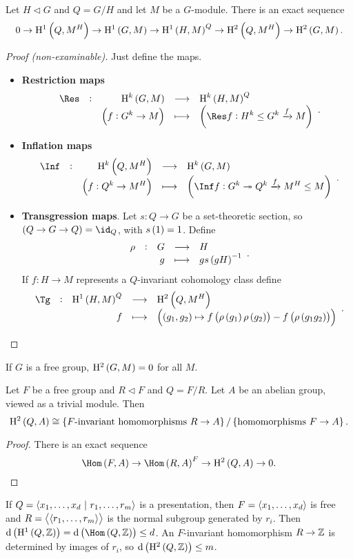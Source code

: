 \begin{theorem}
Let $ H \triangleleft G $ and $ Q = G / H $ and let $ M $ be a $ G $-module. There is an exact sequence
$$ 0 \to \H^1\br{Q, M^H} \to \H^1\br{G, M} \to \H^1\br{H, M}^Q \to \H^2\br{Q, M^H} \to \H^2\br{G, M}. $$
\end{theorem}

\begin{proof}[Proof (non-examinable)]
Just define the maps.
\begin{itemize}
\item \textbf{Restriction maps}
$$ \function[\Res]{\H^k\br{G, M}}{\H^k\br{H, M}^Q}{\br{f : G^k \to M}}{\br{\Res f : H^k \le G^k \xrightarrow{f} M}}. $$
\item \textbf{Inflation maps}
$$ \function[\Inf]{\H^k\br{Q, M^H}}{\H^k\br{G, M}}{\br{f : Q^k \to M^H}}{\br{\Inf f : G^k \twoheadrightarrow Q^k \xrightarrow{f} M^H \le M}}. $$
\item \textbf{Transgression maps}. Let $ s : Q \to G $ be a set-theoretic section, so $ \br{Q \to G \to Q} = \id_Q $, with $ s\br{1} = 1 $. Define
$$ \function[\rho]{G}{H}{g}{gs\br{gH}^{-1}}. $$
If $ f : H \to M $ represents a $ Q $-invariant cohomology class define
$$ \function[\Tg]{\H^1\br{H, M}^Q}{\H^2\br{Q, M^H}}{f}{\br{\br{g_1, g_2} \mapsto f\br{\rho\br{g_1}\rho\br{g_2}} - f\br{\rho\br{g_1g_2}}}}. $$
\end{itemize}
\end{proof}

\pagebreak

If $ G $ is a free group, $ \H^2\br{G, M} = 0 $ for all $ M $.

\begin{corollary}
Let $ F $ be a free group and $ R \triangleleft F $ and $ Q = F / R $. Let $ A $ be an abelian group, viewed as a trivial module. Then
$$ \H^2\br{Q, A} \cong \cbr{\text{$ F $-invariant homomorphisms} \ R \to A} / \cbr{\text{homomorphisms} \ F \to A}. $$
\end{corollary}

\begin{proof}
There is an exact sequence
$$ \Hom\br{F, A} \to \Hom\br{R, A}^F \to \H^2\br{Q, A} \to 0. $$
\end{proof}

If $ Q = \left\langle x_1, \dots, x_d \ \middle| \  r_1, \dots, r_m \right\rangle $ is a presentation, then $ F = \left\langle x_1, \dots, x_d \right\rangle $ is free and $ R = \left\langle \left\langle r_1, \dots, r_m \right\rangle \right\rangle $ is the normal subgroup generated by $ r_i $. Then $ \d\br{\H^1\br{Q, \ZZ}} = \d\br{\Hom\br{Q, \ZZ}} \le d $. An $ F $-invariant homomorphism $ R \to \mathbb{Z} $ is determined by images of $ r_i $, so $ \d\br{\H^2\br{Q, \ZZ}} \le m $.

